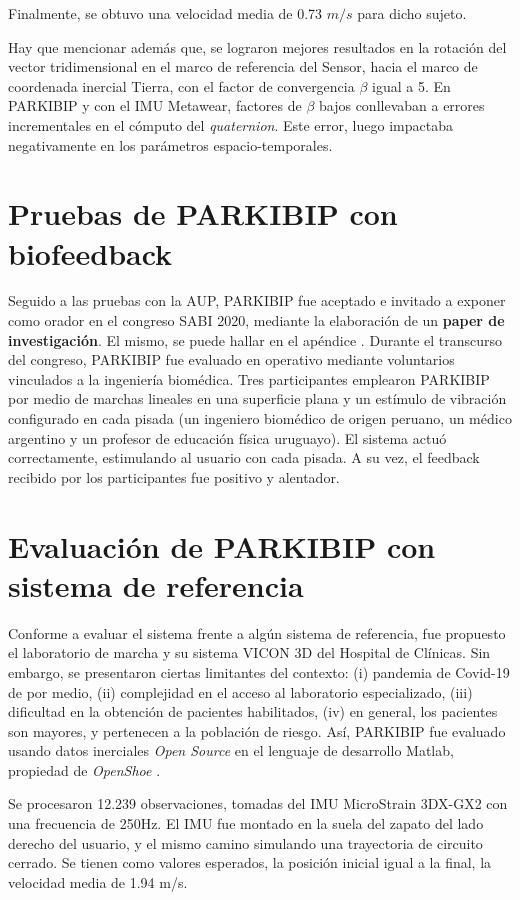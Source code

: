 Finalmente, se obtuvo una velocidad media de 0.73 $m/s$ para dicho sujeto.

Hay que mencionar además que, se lograron mejores resultados en la rotación del vector tridimensional en el marco de referencia del Sensor, hacia el marco de coordenada inercial Tierra, con el factor de convergencia $\beta$ igual a 5. En PARKIBIP y con el IMU Metawear, factores de $\beta$ bajos conllevaban a errores incrementales en el cómputo del \textit{quaternion}. Este error, luego impactaba negativamente en los parámetros espacio-temporales.

\section{Pruebas de PARKIBIP con biofeedback}

Seguido a las pruebas con la AUP, PARKIBIP fue aceptado e invitado a exponer como orador en el congreso SABI 2020, mediante la elaboración de un \textbf{paper de investigación}. El mismo, se puede hallar en el apéndice . Durante el transcurso del congreso, PARKIBIP fue evaluado en operativo mediante voluntarios vinculados a la ingeniería biomédica. Tres participantes emplearon PARKIBIP por medio de marchas lineales en una superficie plana y un estímulo de vibración configurado en cada pisada (un ingeniero biomédico de origen peruano, un médico argentino y un profesor de educación física uruguayo). El sistema actuó correctamente, estimulando al usuario con cada pisada. A su vez, el feedback recibido por los participantes fue positivo y alentador.

\section{Evaluación de PARKIBIP con sistema de referencia}

Conforme a evaluar el sistema frente a algún sistema de referencia, fue propuesto el laboratorio de marcha y su sistema VICON 3D del Hospital de Clínicas. Sin embargo, se presentaron ciertas limitantes del contexto: (i) pandemia de Covid-19 de por medio, (ii) complejidad en el acceso al laboratorio especializado, (iii) dificultad en la obtención de pacientes habilitados, (iv) en general, los pacientes son mayores, y pertenecen a la población de riesgo. Así, PARKIBIP fue evaluado usando datos inerciales \textit{Open Source} en el lenguaje de desarrollo Matlab, propiedad de \textit{OpenShoe} \cite{openshoe}.

Se procesaron 12.239 observaciones, tomadas del IMU  MicroStrain 3DX-GX2 con una frecuencia de 250Hz. El IMU fue montado en la suela del zapato del lado derecho del usuario, y el mismo camino simulando una trayectoria de circuito cerrado. Se tienen como valores esperados, la posición inicial igual a la final, la velocidad media de 1.94 m/s.


